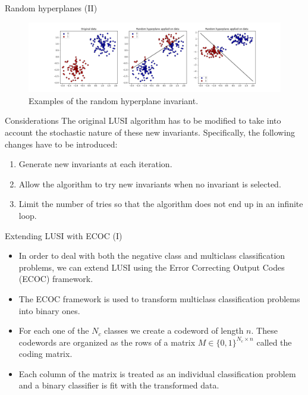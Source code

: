 \documentclass[10pt, dvipsnames]{beamer}
\newcommand{\set}[1]{\lbrace #1 \rbrace}
\begin{document}
\begin{frame}{Random hyperplanes (II)}
    \begin{figure}
        \centering
        \includegraphics[width=\textwidth]{thesis/Figures/random_hyperplanes_example.png}
        \caption{Examples of the random hyperplane invariant.}
    \end{figure}
\end{frame}

\begin{frame}{Considerations}
    The original LUSI algorithm has to be modified to take into account the stochastic nature
    of these new invariants. Specifically, the following changes have to be introduced:
    
    \begin{enumerate}
        \item<2-> Generate new invariants at each iteration.
        \item<3-> Allow the algorithm to try new invariants when no invariant is selected.
        \item<4-> Limit the number of tries so that the algorithm does not end up in an infinite loop.
    \end{enumerate}
\end{frame}

\begin{frame}{Extending LUSI with ECOC (I)}
    \begin{itemize}
        \item<1-> In order to deal with both the negative class and multiclass classification
        problems, we can extend LUSI using the Error Correcting Output Codes (ECOC) framework.
        \item<2-> The ECOC framework is used to transform multiclass classification problems
        into binary ones.
        \item<3-> For each one of the $N_c$ classes we create a codeword of length $n$. These
        codewords are organized as the rows of a matrix $M \in \set{0, 1}^{N_c \times n}$ called
        the \alert{coding matrix}.
        \item<4-> Each column of the matrix is treated as an individual classification problem
        and a binary classifier is fit with the transformed data.
    \end{itemize}
\end{frame}
\end{document}
